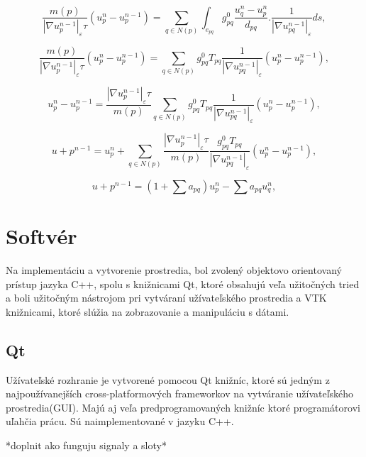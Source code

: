 \documentclass[a4paper,11pt,twoside]{article}%
\def\epsilon{\varepsilon}
\begin{document}
\begin{equation}
\frac{m(p)}{|\nabla u_p^{n-1}|_{\epsilon}\tau}(u_p^n-u_p^{n-1}) = \sum_{q \in N(p)}\int_{e_{pq}}g_{pq}^0\frac{u_q^n - u_p^n}{d_{pq}}.\frac{1}{|\nabla u_{pq}^{n-1}|_{\epsilon}}ds,
\end{equation}

\begin{equation}
\frac{m(p)}{|\nabla u_p^{n-1}|_{\epsilon}\tau}(u_p^n-u_p^{n-1}) = \sum_{q \in N(p)}
g_{pq}^0T_{pq}\frac{1}{|\nabla u_{pq}^{n-1}|_{\epsilon}}(u_p^n-u_p^{n-1}),
\end{equation}

\begin{equation}
u_p^n-u_p^{n-1} =\frac{|\nabla u_p^{n-1}|_{\epsilon}\tau}{m(p)} \sum_{q \in N(p)}
g_{pq}^0T_{pq}\frac{1}{|\nabla u_{pq}^{n-1}|_{\epsilon}}(u_p^n-u_p^{n-1}),
\end{equation}

\begin{equation}
u+p^{n-1} = u_p^n + \sum_{q \in N(p)}\frac{|\nabla u_p^{n-1}|_{\epsilon}\tau}{m(p)} \frac{g_{pq}^0T_{pq}}{|\nabla u_{pq}^{n-1}|_{\epsilon}} (u_p^n-u_p^{n-1}),
\end{equation}

\begin{equation}
u+p^{n-1} = (1 + \sum a_{pq})u_p^n -  \sum a_{pq}u_q^n,
\end{equation}

\newpage
\section{Softvér}

Na implementáciu a vytvorenie prostredia, bol zvolený objektovo orientovaný prístup jazyka C++, spolu s knižnicami Qt, ktoré obsahujú veľa užitočných tried a boli užitočným nástrojom pri vytváraní užívateľského prostredia a VTK knižnicami, ktoré slúžia na zobrazovanie a manipuláciu s dátami.

\subsection{Qt}
Užívateľské rozhranie je vytvorené pomocou Qt knižníc, ktoré sú jedným z najpoužívanejších cross-platformových frameworkov na vytváranie užívateľského prostredia(GUI). Majú aj veľa predprogramovaných knižníc ktoré programátorovi uľahčia prácu. Sú naimplementované v jazyku C++. 

*doplnit ako funguju signaly a sloty*
\end{document}
